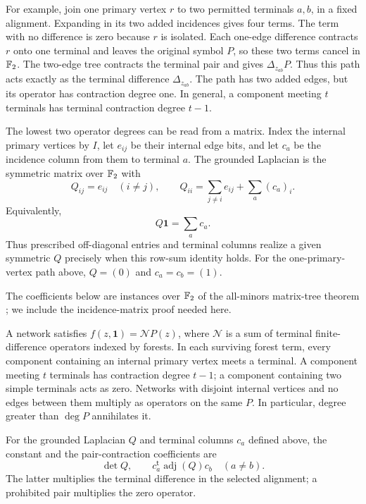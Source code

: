 For example, join one primary vertex $r$ to two permitted terminals
$a,b$, in a fixed alignment. Expanding in its two added incidences gives
four terms. The term with no difference is zero because $r$ is isolated.
Each one-edge difference contracts $r$ onto one terminal and leaves the
original symbol $P$, so these two terms cancel in $\mathbb F_2$. The two-edge
tree contracts the terminal pair and gives $\Delta_{z_{ab}}P$.
Thus this path acts exactly as the terminal difference
$\Delta_{z_{ab}}$. The path has two added edges, but its operator has
contraction degree one. In general, a component meeting $t$ terminals
has terminal contraction degree $t-1$.

The lowest two operator degrees can be read from a matrix. Index the
internal primary vertices by $I$, let $e_{ij}$ be their internal edge
bits, and let $c_a$ be the incidence column from them to terminal $a$.
The grounded Laplacian is the symmetric matrix over $\mathbb F_2$ with
\[
 Q_{ij}=e_{ij}\quad(i\ne j),\qquad
 Q_{ii}=\sum_{j\ne i}e_{ij}+\sum_a(c_a)_i.
\]
Equivalently,
\begin{equation}\label{gr:grounding-dictionary}
                         Q\mathbf1=\sum_a c_a.
\end{equation}
Thus prescribed off-diagonal entries and terminal columns realize a
given symmetric $Q$ precisely when this row-sum identity holds. For the
one-primary-vertex path above, $Q=(0)$ and $c_a=c_b=(1)$.

The coefficients below are instances over $\mathbb F_2$ of the all-minors
matrix-tree theorem \citep[\S1, Equation~(2)]{Chaiken1982}; we include
the incidence-matrix proof needed here.

\begin{lemma}\label{gr:network}
A network satisfies $f(z,\mathbf1)=\mathcal N P(z)$, where
$\mathcal N$ is a sum of terminal finite-difference operators indexed by
forests. In each surviving forest term, every component containing an
internal primary vertex meets a terminal. A component meeting $t$
terminals has contraction degree $t-1$;
a component containing two simple terminals acts as zero.  Networks with
disjoint internal vertices and no edges between them multiply as operators
on the same $P$.  In particular, degree greater than $\deg P$ annihilates it.

For the grounded Laplacian $Q$ and terminal columns $c_a$ defined above,
the constant
and the pair-contraction coefficients are
\begin{equation}\label{gr:forest-coefficients}
 \det Q,\qquad c_a^{\mathsf t}\operatorname{adj}(Q)c_b\quad(a\ne b).
\end{equation}
The latter multiplies the terminal difference in the selected alignment;
a prohibited pair multiplies the zero operator.
\end{lemma}

